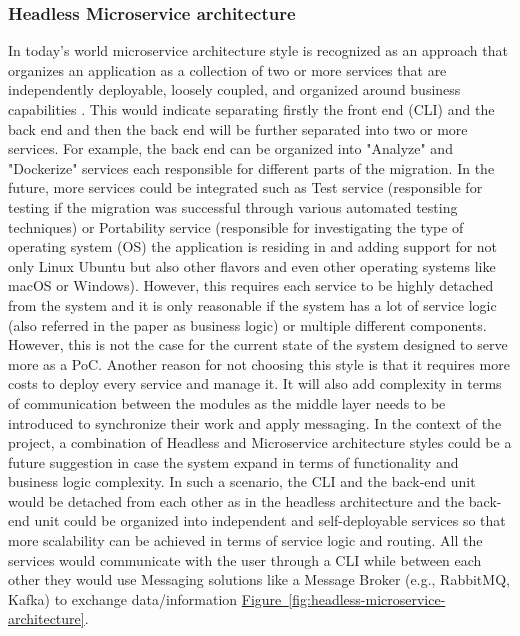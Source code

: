 \documentclass[twocolumn]{article}
\newcommand{\FigRef}[1]{\hyperref[#1]{Figure~\ref{#1}}}
\begin{document}
\subsubsection{Headless Microservice architecture}
In today's world microservice architecture style is recognized as an approach that organizes an application as a collection of two or more services that are independently deployable, loosely coupled, and organized around business capabilities \cite{Thönes-2015}. This would indicate separating firstly the front end (CLI) and the back end and then the back end will be further separated into two or more services. For example, the back end can be organized into "Analyze" and "Dockerize" services each responsible for different parts of the migration. In the future, more services could be integrated such as Test service (responsible for testing if the migration was successful through various automated testing techniques) or Portability service (responsible for investigating the type of operating system (OS) the application is residing in and adding support for not only Linux Ubuntu but also other flavors and even other operating systems like macOS or Windows). However, this requires each service to be highly detached from the system and it is only reasonable if the system has a lot of service logic (also referred in the paper as business logic) or multiple different components. However, this is not the case for the current state of the system designed to serve more as a PoC. Another reason for not choosing this style is that it requires more costs to deploy every service and manage it. It will also add complexity in terms of communication between the modules as the middle layer needs to be introduced to synchronize their work and apply messaging. In the context of the project, a combination of Headless and Microservice architecture styles could be a future suggestion in case the system expand in terms of functionality and business logic complexity. In such a scenario, the CLI and the back-end unit would be detached from each other as in the headless architecture and the back-end unit could be organized into independent and self-deployable services so that more scalability can be achieved in terms of service logic and routing. All the services would communicate with the user through a CLI while between each other they would use Messaging solutions like a Message Broker (e.g., RabbitMQ, Kafka) to exchange data/information \FigRef{fig:headless-microservice-architecture}.
\end{document}
